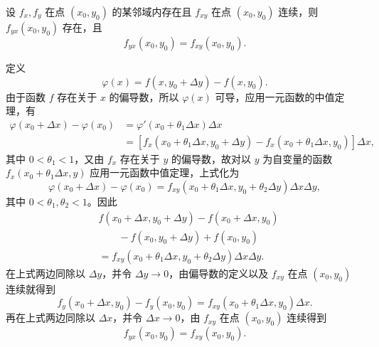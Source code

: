 \begin{xproposition}[19.1.2]
设 $f_x,f_y$ 在点 $(x_0,y_0)$ 的某邻域内存在且 $f_{xy}$ 在点 $(x_0,y_0)$ 连续，则 $f_{yx}(x_0,y_0)$ 存在，且
\[
  f_{yx}(x_0,y_0)=f_{xy}(x_0,y_0).
\]
\end{xproposition}
\begin{xproof}
定义
\[
  \varphi(x)=f(x,y_0+\Delta y)-f(x,y_0).
\]
由于函数 $f$ 存在关于 $x$ 的偏导数，所以 $\varphi(x)$ 可导，应用一元函数的中值定理，有
\begin{align*}
  \varphi(x_0+\Delta x)-\varphi(x_0)
  &=\varphi'(x_0+\theta_1\Delta x)\Delta x\\
  &=[f_x(x_0+\theta_1\Delta x,y_0+\Delta y)-f_x(x_0+\theta_1\Delta x,y_0)]\Delta x,
\end{align*}
其中 $0<\theta_1<1$，又由 $f_x$ 存在关于 $y$ 的偏导数，故对以 $y$ 为自变量的函数 $f_x(x_0+\theta_1\Delta x,y)$ 应用一元函数中值定理，上式化为
\[
  \varphi(x_0+\Delta x)-\varphi(x_0)
  =f_{xy}(x_0+\theta_1\Delta x,y_0+\theta_2\Delta y)\Delta x\Delta y,
\]
其中 $0<\theta_1,\theta_2<1$。因此
\begin{align*}
  &f(x_0+\Delta x,y_0+\Delta y)-f(x_0+\Delta x,y_0)\\
  &\qquad-f(x_0,y_0+\Delta y)+f(x_0,y_0)\\
  &=f_{xy}(x_0+\theta_1\Delta x,y_0+\theta_2\Delta y)\Delta x\Delta y.
\end{align*}
在上式两边同除以 $\Delta y$，并令 $\Delta y\to0$，由偏导数的定义以及 $f_{xy}$ 在点 $(x_0,y_0)$ 连续就得到
\[
  f_y(x_0+\Delta x,y_0)-f_y(x_0,y_0)
  =f_{xy}(x_0+\theta_1\Delta x,y_0)\Delta x.
\]
再在上式两边同除以 $\Delta x$，并令 $\Delta x\to0$，由 $f_{xy}$ 在点 $(x_0,y_0)$ 连续得到
\[
  f_{yx}(x_0,y_0)=f_{xy}(x_0,y_0).
\]
\end{xproof}

